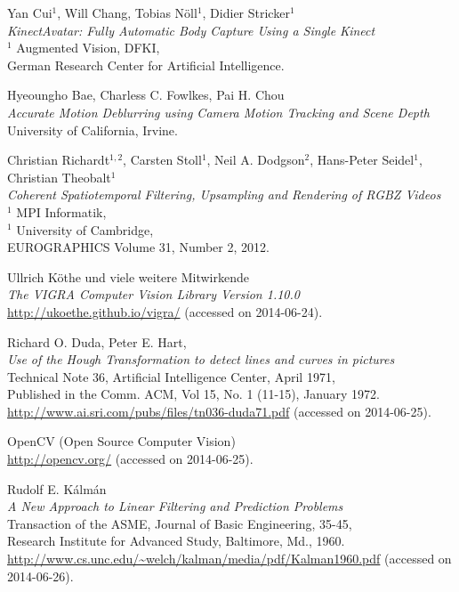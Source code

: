 \documentclass[12pt,a4paper,ngerman]{scrartcl}
\begin{document}
\begin{thebibliography}{99}
Yan Cui$^{1}$, Will Chang, Tobias Nöll$^{1}$, Didier Stricker$^{1}$\\
{\em KinectAvatar: Fully Automatic Body Capture Using a Single Kinect}\\
$^{1}$ Augmented Vision, DFKI,\\
German Research Center for Artificial Intelligence.

Hyeoungho Bae, Charless C. Fowlkes, Pai H. Chou\\
{\em Accurate Motion Deblurring using Camera Motion Tracking and Scene Depth}\\
University of California, Irvine.

Christian Richardt$^{1,2}$, Carsten Stoll$^{1}$, Neil A. Dodgson$^{2}$, Hans-Peter Seidel$^{1}$, Christian Theobalt$^{1}$\\
{\em Coherent Spatiotemporal Filtering, Upsampling and Rendering of RGBZ Videos}\\
$^{1}$ MPI Informatik,\\
$^{1}$ University of Cambridge,\\
EUROGRAPHICS Volume 31, Number 2, 2012.

Ullrich Köthe und viele weitere Mitwirkende\\
{\em The VIGRA Computer Vision Library Version 1.10.0}\\
\url{http://ukoethe.github.io/vigra/} (accessed on 2014-06-24).

Richard O. Duda, Peter E. Hart,\\
{\em Use of the Hough Transformation to detect lines and curves in pictures}\\
Technical Note 36, Artificial Intelligence Center, April 1971,\\
Published in the  Comm. ACM, Vol 15, No. 1 (11-15), January 1972.\\
\url{http://www.ai.sri.com/pubs/files/tn036-duda71.pdf} (accessed on 2014-06-25).

OpenCV (Open Source Computer Vision)\\
\url{http://opencv.org/} (accessed on 2014-06-25).

Rudolf E. Kálmán\\
{\em A New Approach to Linear Filtering and Prediction Problems}\\
Transaction of the ASME, Journal of Basic Engineering, 35-45,\\
Research Institute for Advanced Study, Baltimore, Md., 1960.\\
\url{http://www.cs.unc.edu/~welch/kalman/media/pdf/Kalman1960.pdf} (accessed on 2014-06-26).


\end{thebibliography}
\end{document}
